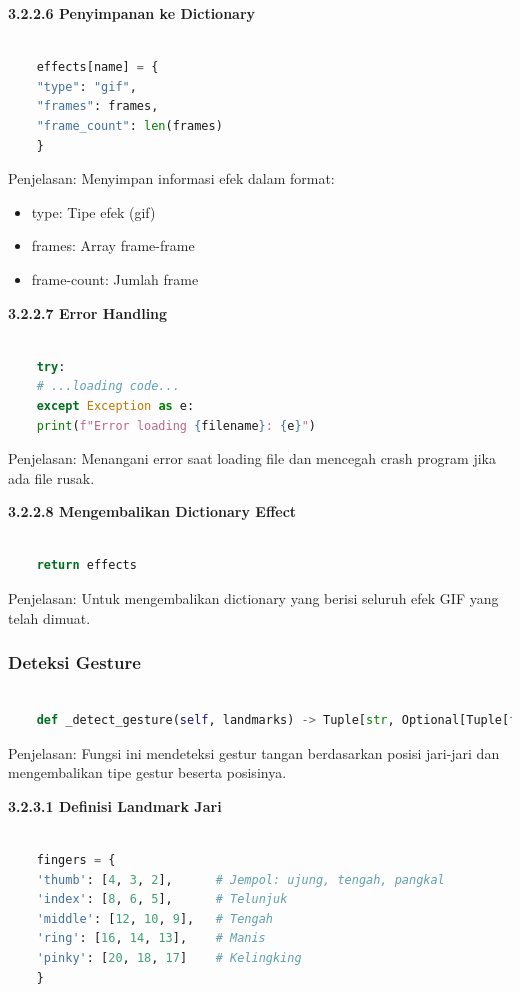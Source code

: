 \documentclass[11pt,a4paper]{article}
\begin{document}
    \noindent\textbf{3.2.2.6 Penyimpanan ke Dictionary}
    \begin{lstlisting}[language=Python, caption=Penyimpanan ke Dictionary]
        
    effects[name] = {
    "type": "gif",
    "frames": frames,
    "frame_count": len(frames)
    }
    \end{lstlisting}
    Penjelasan: Menyimpan informasi efek dalam format:
    \begin{itemize}
        \item type: Tipe efek (gif)
        \item frames: Array frame-frame
        \item frame-count: Jumlah frame
    \end{itemize}

    \noindent\textbf{3.2.2.7 Error Handling}
    \begin{lstlisting}[language=Python, caption=Error Handling]
        
    try:
    # ...loading code...
    except Exception as e:
    print(f"Error loading {filename}: {e}")
    \end{lstlisting}
    Penjelasan: Menangani error saat loading file dan mencegah crash program jika ada file rusak.

    \noindent\textbf{3.2.2.8 Mengembalikan Dictionary Effect}
    \begin{lstlisting}[language=Python, caption=Mengembalikan Dictionary Efek]
        
    return effects
    \end{lstlisting}
    Penjelasan:  Untuk mengembalikan dictionary yang berisi seluruh efek GIF yang telah dimuat. 
    
    \subsubsection{Deteksi Gesture }
    \begin{lstlisting}[language=Python, caption=Deteksi Gesture]
        
    def _detect_gesture(self, landmarks) -> Tuple[str, Optional[Tuple[float, float]]]:
    \end{lstlisting}
    Penjelasan: Fungsi ini mendeteksi gestur tangan berdasarkan posisi jari-jari dan mengembalikan tipe gestur beserta posisinya.

    \noindent\textbf{3.2.3.1 Definisi Landmark Jari}
    \begin{lstlisting}[language=Python, caption=Definisi Landmark Jari]
        
    fingers = {
    'thumb': [4, 3, 2],      # Jempol: ujung, tengah, pangkal
    'index': [8, 6, 5],      # Telunjuk
    'middle': [12, 10, 9],   # Tengah
    'ring': [16, 14, 13],    # Manis
    'pinky': [20, 18, 17]    # Kelingking
    }
    \end{lstlisting}
\end{document}
